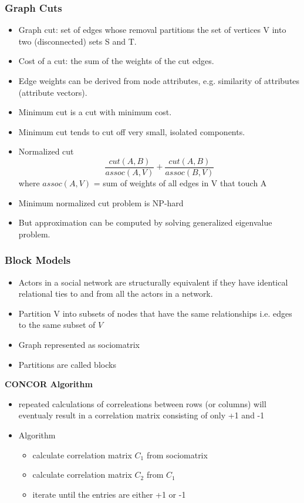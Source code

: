 \documentclass[../notes.tex]{subfiles}
\begin{document}
\subsubsection{Graph Cuts}
\begin{itemize}
  \item Graph cut: set of edges whose removal partitions the set of vertices V into two (disconnected) sets S and T.
  \item Cost of a cut: the sum of the weights of the cut edges.
  \item Edge weights can be derived from node attributes, e.g. similarity of attributes (attribute vectors).
  \item Minimum cut is a cut with minimum cost.
  \item Minimum cut tends to cut off very small, isolated components.
  \item Normalized cut $$\frac{cut(A, B)}{assoc(A, V)} + \frac{cut(A, B)}{assoc(B, V)}$$
  where $assoc(A, V)$ =  sum of weights of all edges in V that touch A
  \item Minimum normalized cut problem is NP-hard
  \item But approximation can be computed by solving generalized eigenvalue problem.
\end{itemize}

\subsubsection{Block Models}
\begin{itemize}
  \item Actors in a social network are structurally equivalent if they have identical relational ties to and from all the actors in a network.
  \item Partition V into subsets of nodes that have the same relationships i.e. edges to the same subset of $V$
  \item Graph represented as sociomatrix
  \item Partitions are called blocks
\end{itemize}

\textbf{CONCOR Algorithm}
\begin{itemize}
  \item repeated calculations of correleations between rows (or columns) will eventualy result in a correlation matrix consisting of only +1 and -1
  
  \item Algorithm
  \begin{itemize}
    \item calculate correlation matrix $C_1$ from sociomatrix
    \item calculate correlation matrix $C_2$ from $C_1$
    \item iterate until the entries are either +1 or -1
  \end{itemize}
\end{itemize}
\end{document}
